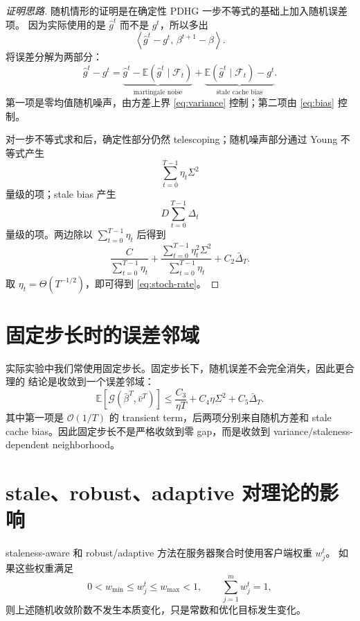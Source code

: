 \documentclass[UTF8,a4paper,11pt]{ctexart}
\begin{document}
\begin{proof}[证明思路]
随机情形的证明是在确定性 PDHG 一步不等式的基础上加入随机误差项。
因为实际使用的是 $\widehat{g}^t$ 而不是 $g^t$，所以多出
\[
    \left\langle
    \widehat{g}^t-g^t,\,
    \beta^{t+1}-\beta
    \right\rangle .
\]
将误差分解为两部分：
\[
    \widehat{g}^t-g^t
    =
    \underbrace{
    \widehat{g}^t
    -
    \mathbb{E}(\widehat{g}^t\mid\mathcal{F}_t)
    }_{\text{martingale noise}}
    +
    \underbrace{
    \mathbb{E}(\widehat{g}^t\mid\mathcal{F}_t)
    -
    g^t
    }_{\text{stale cache bias}}.
\]
第一项是零均值随机噪声，由方差上界 \eqref{eq:variance} 控制；第二项由
\eqref{eq:bias} 控制。

对一步不等式求和后，确定性部分仍然 telescoping；随机噪声部分通过 Young
不等式产生
\[
    \sum_{t=0}^{T-1}
    \eta_t\Sigma^2
\]
量级的项；stale bias 产生
\[
    D\sum_{t=0}^{T-1}\Delta_t
\]
量级的项。两边除以 $\sum_{t=0}^{T-1}\eta_t$ 后得到
\[
    \frac{C}{\sum_{t=0}^{T-1}\eta_t}
    +
    \frac{\sum_{t=0}^{T-1}\eta_t^2\Sigma^2}
    {\sum_{t=0}^{T-1}\eta_t}
    +
    C_2\bar{\Delta}_T.
\]
取 $\eta_t=\Theta(T^{-1/2})$，即可得到
\eqref{eq:stoch-rate}。
\end{proof}

\section{固定步长时的误差邻域}

实际实验中我们常使用固定步长。固定步长下，随机误差不会完全消失，因此更合理的
结论是收敛到一个误差邻域：
\begin{equation}
    \mathbb{E}
    \left[
    \mathcal{G}(\bar{\beta}^T,\bar{v}^T)
    \right]
    \le
    \frac{C_3}{\eta T}
    +
    C_4\eta\Sigma^2
    +
    C_5\bar{\Delta}_T .
    \label{eq:fixed}
\end{equation}
其中第一项是 $\mathcal{O}(1/T)$ 的 transient term，后两项分别来自随机方差和
stale cache bias。因此固定步长不是严格收敛到零 gap，而是收敛到
variance/staleness-dependent neighborhood。

\section{stale、robust、adaptive 对理论的影响}

staleness-aware 和 robust/adaptive 方法在服务器聚合时使用客户端权重 $w_j^t$。
如果这些权重满足
\[
    0<w_{\min}\le w_j^t\le w_{\max}<1,
    \qquad
    \sum_{j=1}^m w_j^t=1,
\]
则上述随机收敛阶数不发生本质变化，只是常数和优化目标发生变化。
\end{document}
